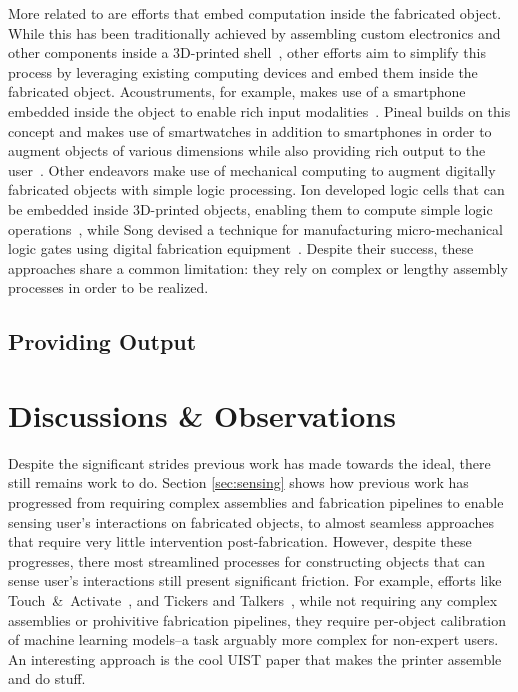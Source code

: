       More related to \al are efforts that embed computation inside the
      fabricated object. While this has been traditionally achieved by
      assembling custom electronics and other components inside a
      3D-printed shell~\cite{Murray-Smith:2008}, other efforts aim to
      simplify this process by leveraging existing computing devices and
      embed them inside the fabricated object. Acoustruments, for
      example, makes use of a smartphone embedded inside the object to
      enable rich input modalities~\cite{Laput:2015}. Pineal builds on
      this concept and makes use of smartwatches in addition to
      smartphones in order to augment objects of various dimensions while
      also providing rich output to the user~\cite{Ledo:2017}. Other
      endeavors make use of mechanical computing to augment digitally
      fabricated objects with simple logic processing. Ion \etal
      developed logic cells that can be embedded inside 3D-printed
      objects, enabling them to compute simple logic
      operations~\cite{Ion:2017}, while Song \etal devised a technique
      for manufacturing micro-mechanical logic gates using digital
      fabrication equipment~\cite{Song:2019}. Despite their success,
      these approaches share a common limitation: they rely on complex or
      lengthy assembly processes in order to be realized.

    \subsection{Providing Output} \label{sec:output}

  \section{Discussions \& Observations}
    Despite the significant strides previous work has made towards the \papf
    ideal, there still remains work to do. Section \ref{sec:sensing} shows how
    previous work has progressed from requiring complex assemblies and
    fabrication pipelines to enable sensing user's interactions on fabricated
    objects, to almost seamless approaches that require very little intervention
    post-fabrication. However, despite these progresses, there most streamlined
    processes for constructing objects that can sense user's interactions still
    present significant friction. For example, efforts like
    Touch~\&~Activate~\cite{}, and Tickers and Talkers~\cite{}, while not
    requiring any complex assemblies or prohivitive fabrication pipelines, they
    require per-object calibration of machine learning models--a task arguably
    more complex for non-expert users. An interesting approach is the cool UIST
    paper that makes the printer assemble and do stuff.

